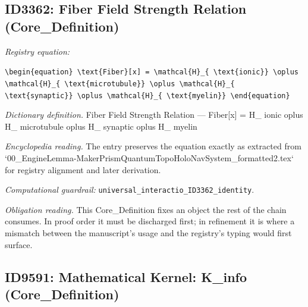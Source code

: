 \documentclass[11pt]{article}
\theoremstyle{remark}
\begin{document}
\subsection{ID3362: Fiber Field Strength Relation (Core\_Definition)}

\noindent\textit{Registry equation:}\par
{\small\texttt{\textbackslash{}begin\{equation\} \textbackslash{}text\{Fiber\}[x] = \textbackslash{}mathcal\{H\}\_\{ \textbackslash{}text\{ionic\}\} \textbackslash{}oplus \textbackslash{}mathcal\{H\}\_\{ \textbackslash{}text\{microtubule\}\} \textbackslash{}oplus \textbackslash{}mathcal\{H\}\_\{ \textbackslash{}text\{synaptic\}\} \textbackslash{}oplus \textbackslash{}mathcal\{H\}\_\{ \textbackslash{}text\{myelin\}\} \textbackslash{}end\{equation\}}}\par\medskip
\noindent\textit{Dictionary definition.} Fiber Field Strength Relation --- Fiber[x] = H\_ ionic oplus H\_ microtubule oplus H\_ synaptic oplus H\_ myelin\par\medskip
\noindent\textit{Encyclopedia reading.} The entry preserves the equation exactly as extracted from `00\_EngineLemma-MakerPrismQuantumTopoHoloNavSystem\_formatted2.tex` for registry alignment and later derivation.
\par\medskip\noindent\textit{Computational guardrail:} \texttt{universal\_interactio\_ID3362\_identity}.
\par\medskip\noindent\textit{Obligation reading.} This Core\_Definition fixes an object the rest of the chain consumes. In proof order it must be discharged first; in refinement it is where a mismatch between the manuscript's usage and the registry's typing would first surface.

\subsection{ID9591: Mathematical Kernel: K\_info (Core\_Definition)}
\end{document}
